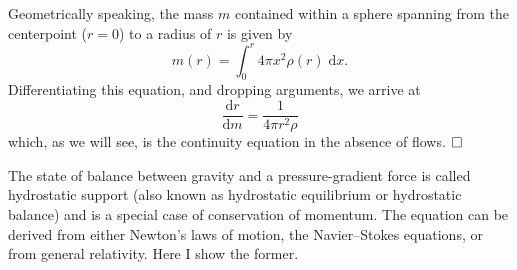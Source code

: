 \begin{description}%
    \setlength{\itemindent}{0pt}
    \item[Conservation of Mass.]
    Geometrically speaking, the mass $m$ contained within a sphere spanning from the centerpoint (${r=0}$) to a radius of $r$ is given by 
    \begin{equation}
        m(r)
        =
        \int_0^r 4 \pi x^2 \rho(r) \; \text{d}x.
    \end{equation}
    Differentiating this equation, and dropping arguments, we arrive at 
    \begin{equation} \label{eq:cons-mass} \boxed{
        \frac{\text{d}r}{\text{d}m}
        =
        \frac{1}{4\pi r^2\rho}
    }\end{equation}
    which, as we will see, is the continuity equation in the absence of flows. $\hfill\square\;$
    
    \item[Conservation of Momentum.] 
    The state of balance between gravity and a pressure-gradient force is called hydrostatic support (also known as hydrostatic equilibrium or hydrostatic balance) and is a special case of conservation of momentum. 
    The equation can be derived from either Newton's laws of motion, the Navier--Stokes equations, or from general relativity. 
    Here I show the former. 
    

\end{description}
